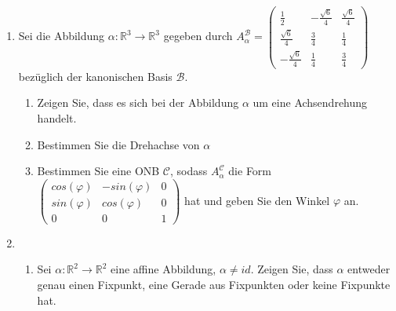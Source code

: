 \documentclass[a4paper]{article}
\begin{document}
\begin{enumerate}
\item Sei die Abbildung $\alpha : \mathbb{R}^3 \rightarrow \mathbb{R}^3$ gegeben durch $A^{\mathcal{B}}_{\alpha} = 
\begin{pmatrix}
\frac{1}{2} &- \frac{\sqrt{6}}{4} &\frac{\sqrt{6}}{4} \\
\frac{\sqrt{6}}{4} & \frac{3}{4} & \frac{1}{4} \\
- \frac{\sqrt{6}}{4} & \frac{1}{4} & \frac{3}{4}
\end{pmatrix}$
 bezüglich der kanonischen Basis $\mathcal{B}$.
\begin{enumerate}[label=(\alph*)]
\item Zeigen Sie, dass es sich bei der Abbildung $\alpha$ um eine Achsendrehung handelt. 
\item Bestimmen Sie die Drehachse von $\alpha$
\item Bestimmen Sie eine ONB $\mathcal{C}$, sodass $A^{\mathcal{C}}_{\alpha}$ die Form $\begin{pmatrix}
cos(\varphi) & - sin(\varphi) & 0\\
sin(\varphi) & cos(\varphi) & 0\\
0&0&1
\end{pmatrix}$ hat und geben Sie den Winkel $\varphi$ an.
\end{enumerate}

\item \begin{enumerate}[label=(\alph*)]
			\item Sei $\alpha :\mathbb{R}^2 \rightarrow \mathbb{R}^2$ eine affine Abbildung, $\alpha \neq id$. Zeigen Sie, dass $\alpha$ entweder genau einen Fixpunkt, eine Gerade aus Fixpunkten oder keine Fixpunkte hat.
			

\end{enumerate}
\end{enumerate}
\end{document}
